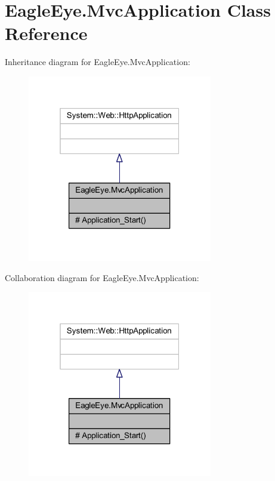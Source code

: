 \hypertarget{class_eagle_eye_1_1_mvc_application}{}\section{Eagle\+Eye.\+Mvc\+Application Class Reference}
\label{class_eagle_eye_1_1_mvc_application}


Inheritance diagram for Eagle\+Eye.\+Mvc\+Application\+:\nopagebreak
\begin{figure}[H]
\begin{center}
\leavevmode
\includegraphics[width=229pt]{class_eagle_eye_1_1_mvc_application__inherit__graph}
\end{center}
\end{figure}


Collaboration diagram for Eagle\+Eye.\+Mvc\+Application\+:\nopagebreak
\begin{figure}[H]
\begin{center}
\leavevmode
\includegraphics[width=229pt]{class_eagle_eye_1_1_mvc_application__coll__graph}
\end{center}
\end{figure}
